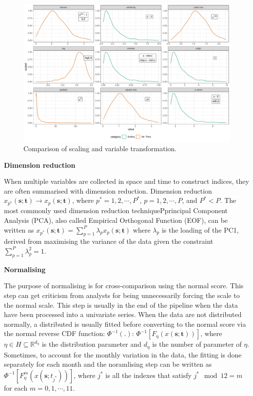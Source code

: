 \documentclass[
]{article}
\begin{document}
\begin{figure}

{\centering \includegraphics{paper_files/figure-pdf/fig-scale-var-trans-compare-1.pdf}

}

\caption{\label{fig-scale-var-trans-compare}Comparison of scaling and
variable transformation.}

\end{figure}

\textbf{Dimension reduction}

When multiple variables are collected in space and time to construct
indices, they are often summarised with dimension reduction. Dimension
reduction
\(x_{p^*}(\mathbf{s}; \mathbf{t}) \rightarrow x_p(\mathbf{s}; \mathbf{t})\),
where \(p^* = 1, 2, \cdots, P^*\), \(p = 1, 2, \cdots, P\), and
\(P^* < P\). The most commonly used dimension reduction
techniquePprincipal Component Analysis (PCA), also called Empirical
Orthogonal Function (EOF), can be written as
\(x_{p^*}(\mathbf{s}; \mathbf{t}) = \sum_{p = 1}^{P}\lambda_{p}x_p(\mathbf{s};\mathbf{t})\)
where \(\lambda_p\) is the loading of the PC1, derived from maximising
the variance of the data given the constraint
\(\sum_{p=1}^P\lambda_p^2 = 1\).

\textbf{Normalising}

The purpose of normalising is for cross-comparison using the normal
score. This step can get criticism from analysts for being unnecessarily
forcing the scale to the normal scale. This step is usually in the end
of the pipeline when the data have been processed into a univariate
series. When the data are not distributed normally, a distributed is
usually fitted before converting to the normal score via the normal
reverse CDF function: \(\Phi^{-1}(.)\):
\(\Phi^{-1}[F_{\eta}(x(\mathbf{s}; \mathbf{t}))]\), where
\(\eta \in H \subseteq \mathbb{R}^{d_{\eta}}\) is the distribution
parameter and \(d_{\eta}\) is the number of parameter of \(\eta\).
Sometimes, to account for the monthly variation in the data, the fitting
is done separately for each month and the noramlising step can be
written as \(\Phi^{-1}[F_{\eta}^m(x(\mathbf{s};t_{j^*}))]\), where
\(j^*\) is all the indexes that satisfy \(j^* \mod 12 = m\) for each
\(m = 0, 1,\cdots, 11\).
\end{document}
